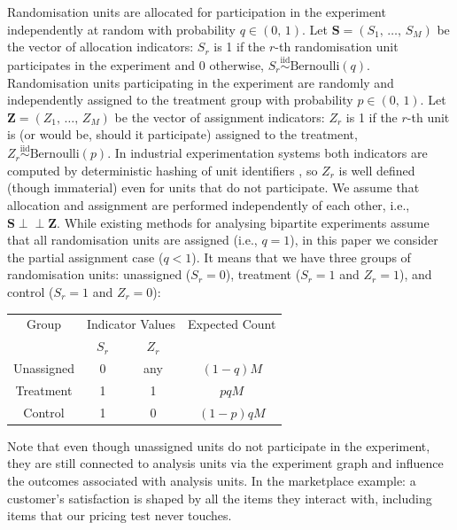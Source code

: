 \documentclass[sigconf]{acmart}
\newcommand{\iidsiminline}{{\scriptstyle\stackrel{\mathrm{iid}}{\sim}}}
\newcommand{\ind}{\perp\!\!\!\perp}
\begin{document}
Randomisation units are allocated for participation in the experiment independently at random with probability $q\in(0,\,1)$. Let $\mathbf{S} =(S_1,\,\ldots,\,S_M)$ be the vector of allocation indicators: $S_r$ is 1 if the $r$-th randomisation unit participates in the experiment and $0$ otherwise, $S_r\iidsiminline \mathrm{Bernoulli}(q)$. Randomisation units participating in the experiment are randomly and independently assigned to the treatment group with probability $p\in(0,\,1)$. Let $\mathbf Z=(Z_1,\,\ldots,\,Z_M)$ be the vector of assignment indicators: $Z_r$ is 1 if the $r$-th unit is (or would be, should it participate) assigned to the treatment, $Z_r\iidsiminline \mathrm{Bernoulli}(p)$. In industrial experimentation systems both indicators are computed by deterministic hashing of unit identifiers \cite{tang2010overlapping,kohavi2020trustworthy}, so $Z_r$ is well defined (though immaterial) even for units that do not participate. We assume that allocation and assignment are performed independently of each other, i.e., $\mathbf S \ind \mathbf{Z}$. While existing methods for analysing bipartite experiments assume that all randomisation units are assigned (i.e., $q=1$), in this paper we consider the partial assignment case ($q < 1$). It means that we have three groups of randomisation units: unassigned ($S_r = 0$), treatment ($S_r=1$ and $Z_r=1$), and control ($S_r=1$ and $Z_r=0$):
\begin{center}
    \begin{tabular}{cccc}
    \hline
    Group & \multicolumn{2}{c}{Indicator Values} & Expected Count\\
    & $S_r$ & $Z_r$ & \\
    \hline
    Unassigned & 0 & any & $(1-q) M$\\
    Treatment & 1 & 1 & $pq M$\\
    Control & 1 & 0 & $(1-p)q M$\\
    \hline
\end{tabular}
\end{center}
Note that even though unassigned units do not participate in the experiment, they are still connected to analysis units via the experiment graph and influence the outcomes associated with analysis units. In the marketplace example: a customer's satisfaction is shaped by all the items they interact with, including items that our pricing test never touches.
\end{document}
